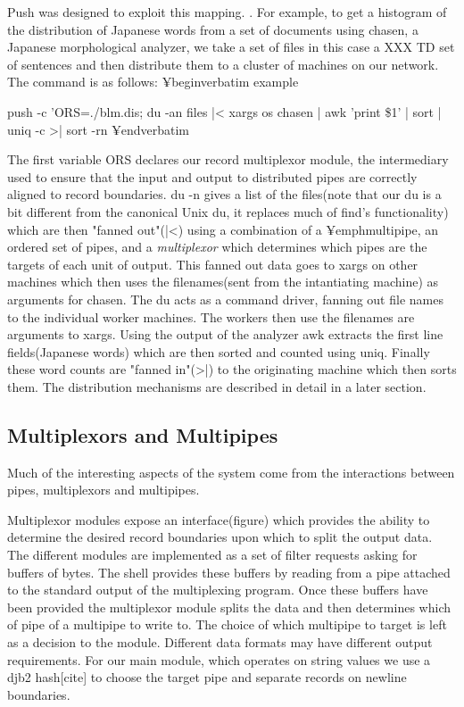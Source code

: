 \documentclass[11pt, letterpaper]{article}
\begin{document}
Push was designed to exploit this mapping.   . For example, to get a histogram of the distribution of Japanese words from a set of documents using chasen, a Japanese morphological analyzer, we take a set of files in this case a XXX TD set of sentences and then distribute them to a cluster of machines on our network. The command is as follows:  
¥begin{verbatim}
example{
push -c '{ORS=./blm.dis; du -an files |< xargs os chasen | awk '{print \$1}' | sort | uniq -c >|  sort -rn
}
¥end{verbatim}
  
The first variable ORS declares our record multiplexor module, the intermediary used to ensure that the input and output to distributed pipes are correctly aligned to record boundaries. du -n gives a list of the files(note that our du is a bit different from the canonical Unix du, it replaces much of find's functionality) which are then "fanned out"(|<) using a combination of a ¥emph{multipipe}, an ordered set of pipes, and a \emph{multiplexor} which determines which pipes are the targets of each unit of output.  This fanned out data goes to xargs on other machines which then uses the filenames(sent from the intantiating machine) as arguments for chasen. The du acts as a command driver, fanning out file names to the individual worker machines. The workers then use the filenames are arguments to xargs. Using the output of the analyzer awk extracts the first line fields(Japanese words) which are then sorted and counted using uniq.  Finally these word counts are "fanned in"(>|) to the originating machine which then sorts them. The distribution mechanisms are described in detail in a later section.    

 
 

\subsection{Multiplexors and Multipipes}

Much of the interesting aspects of the system come from the interactions between pipes, multiplexors and multipipes.    


Multiplexor modules expose an interface(figure) which provides the ability to determine the desired record boundaries upon which to split the output data. The different modules are implemented as a set of filter requests asking for buffers of bytes. The shell provides these buffers by reading from a pipe attached to the standard output of the multiplexing program. Once these buffers have been provided the multiplexor module splits the data and then determines which of pipe of a multipipe to write to. The choice of which multipipe to target is left as a decision to the module. Different data formats may have different output requirements. For our main module, which operates on string values we use a djb2 hash[cite] to choose the target pipe and separate records on newline boundaries.

}
\end{document}
